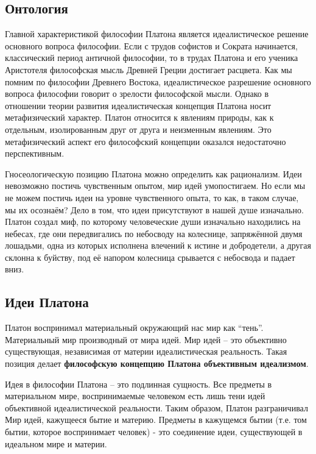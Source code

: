 \documentclass[a4paper, 14pt]{extreport}
\begin{document}
\subsection{Онтология}

Главной характеристикой философии Платона является идеалистическое
решение основного вопроса философии. Если с трудов софистов и Сократа
начинается, классический период античной философии, то в трудах Платона
и его ученика Аристотеля философская мысль Древней Греции достигает
расцвета. Как мы помним по философии Древнего Востока, идеалистическое
разрешение основного вопроса философии говорит о зрелости философской
мысли. Однако в отношении теории развития идеалистическая концепция
Платона носит метафизический характер. Платон относится к явлениям
природы, как к отдельным, изолированным друг от друга и неизменным
явлениям. Это метафизический аспект его философский концепции оказался
недостаточно перспективным.

Гносеологическую позицию Платона можно определить как рационализм. Идеи
невозможно постичь чувственным опытом, мир идей умопостигаем. Но если мы
не можем постичь идеи на уровне чувственного опыта, то как, в таком
случае, мы их осознаём? Дело в том, что идеи присутствуют в нашей душе
изначально. Платон создал миф, по которому человеческие души изначально
находились на небесах, где они передвигались по небосводу на колеснице,
запряжённой двумя лошадьми, одна из которых исполнена влечений к истине
и добродетели, а другая склонна к буйству, под её напором колесница
срывается с небосвода и падает вниз.

\subsection{Идеи Платона}

Платон воспринимал материальный окружающий нас мир как ``тень''.
Материальный мир производный от мира идей. Мир идей -- это объективно
существующая, независимая от материи идеалистическая реальность. Такая
позиция делает \textbf{философскую концепцию Платона объективным
идеализмом}.

Идея в философии Платона -- это подлинная сущность. Все предметы в
материальном мире, воспринимаемые человеком есть лишь тени идей
объективной идеалистической реальности. Таким образом, Платон
разграничивал Мир идей, кажущееся бытие и материю. Предметы в кажущемся
бытии (т.е. том бытии, которое воспринимает человек) - это соединение
идеи, существующей в идеальном мире и материи.
\end{document}
